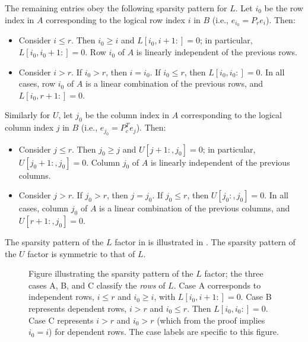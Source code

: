 \documentclass[10pt,twoside]{siamart1116}
\numberwithin{theorem}{section}
\begin{document}
\begin{theorem}
  The remaining entries obey the following sparsity pattern for $L$. Let $i_0$ be the row index in $A$ corresponding to the logical row index $i$ in $B$ (i.e., $e_{i_0} = P_r e_i$). Then:
  \begin{itemize}
    \item Consider $i \le r$. Then $i_0 \ge i$ and $L[i_0, i+1:] = 0$; in particular, $L[i_0, i_0+1:] = 0$. Row $i_0$ of $A$ is linearly independent of the previous rows.
    \item Consider $i > r$. If $i_0 > r$, then $i = i_0$. If $i_0 \le r$, then $L[i_0, i_0:] = 0$. In all cases, row $i_0$ of $A$ is a linear combination of the previous rows, and $L[i_0, r+1:] = 0$.
  \end{itemize}
  Similarly for $U$, let $j_0$ be the column index in $A$ corresponding to the logical column index $j$ in $B$ (i.e., $e_{j_0} = P_c^T e_j$). Then:
  \begin{itemize}
    \item Consider $j \le r$. Then $j_0 \ge j$ and $U[j+1:, j_0] = 0$; in particular, $U[j_0+1:, j_0] = 0$. Column $j_0$ of $A$ is linearly independent of the previous columns.
    \item Consider $j > r$. If $j_0 > r$, then $j = j_0$. If $j_0 \le r$, then $U[j_0:, j_0] = 0$. In all cases, column $j_0$ of $A$ is a linear combination of the previous columns, and $U[r+1:, j_0] = 0$.
  \end{itemize}
\end{theorem}

The sparsity pattern of the $L$ factor in  is illustrated in . The sparsity pattern of the $U$ factor is symmetric to that of $L$.

\begin{figure}
  \centering
  
  \caption{\label{fig:sparsity} Figure illustrating the sparsity pattern of the $L$ factor; the three cases A, B, and C classify the \emph{rows} of $L$. Case A corresponds to independent rows, $i \le r$ and $i_0 \ge i$, with $L[i_0, i+1:] = 0$. Case B represents dependent rows, $i > r$ and $i_0 \le r$. Then $L[i_0, i_0:] = 0$. Case C represents $i > r$ and $i_0 > r$ (which from the proof implies $i_0 = i$) for dependent rows. The case labels are specific to this figure.}
\end{figure}
\end{document}
